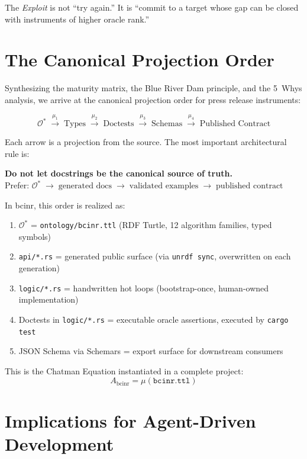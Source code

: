 \documentclass[11pt,a4paper]{article}
\theoremstyle{definition}
\begin{document}
The \textit{Exploit} is not ``try again.'' It is ``commit to a target whose gap can be closed with instruments of higher oracle rank.''

\section{The Canonical Projection Order}

Synthesizing the maturity matrix, the Blue River Dam principle, and the 5~Whys analysis, we arrive at the canonical projection order for press release instruments:

$$\mathcal{O}^* \;\xrightarrow{\mu_1}\; \text{Types} \;\xrightarrow{\mu_2}\; \text{Doctests} \;\xrightarrow{\mu_3}\; \text{Schemas} \;\xrightarrow{\mu_4}\; \text{Published Contract}$$

Each arrow is a projection from the source. The most important architectural rule is:

\begin{rulebox}
\textbf{Do not let docstrings be the canonical source of truth.}\\[4pt]
Prefer: \quad $\mathcal{O}^*\;{\to}\;\text{generated docs}\;{\to}\;\text{validated examples}\;{\to}\;\text{published contract}$
\end{rulebox}

In bcinr, this order is realized as:
\begin{enumerate}
\item $\mathcal{O}^*$ = \texttt{ontology/bcinr.ttl} (RDF Turtle, 12 algorithm families, typed symbols)
\item \texttt{api/*.rs} = generated public surface (via \texttt{unrdf sync}, overwritten on each generation)
\item \texttt{logic/*.rs} = handwritten hot loops (bootstrap-once, human-owned implementation)
\item Doctests in \texttt{logic/*.rs} = executable oracle assertions, executed by \texttt{cargo test}
\item JSON Schema via Schemars = export surface for downstream consumers
\end{enumerate}

This is the Chatman Equation instantiated in a complete project:
$$A_{\text{bcinr}} = \mu(\texttt{bcinr.ttl})$$

\section{Implications for Agent-Driven Development}
\end{document}
